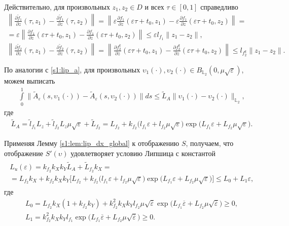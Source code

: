 \documentclass[../main.tex]{subfiles}
\begin{document}
Действительно, для произвольных $z_1, z_2 \in D$ и всех $\tau \in [0, 1]$ справедливо
\begin{gather*}
	 \left\| \frac{\partial \widetilde{f}_1}{\partial z}(\tau, z_1) - \frac{\partial \widetilde{f}_1}{\partial z}(\tau, z_2) \right\| = 
	 \left\| \varepsilon \frac{\partial f_1}{\partial z}(\varepsilon \tau + t_0, z_1) - \varepsilon \frac{\partial f_1}{\partial z}(\varepsilon \tau + t_0, z_2) \right\| = \\ =
	 \varepsilon \left\| \frac{\partial f_1}{\partial z}(\varepsilon \tau + t_0, z_1) - \frac{\partial f_1}{\partial z}(\varepsilon \tau + t_0, z_2) \right\| 
	 \leqslant \varepsilon l_{f_1} \| z_1 - z_2\|, \\
	 \left\| \frac{\partial \widetilde{f}_2}{\partial z}(\tau,z_1) - \frac{\partial \widetilde{f}_2}{\partial z}(\tau,z_2) \right\| = 
	\left\| \frac{\partial f_2^k}{\partial z}(\varepsilon \tau + t_0,z_1) - \frac{\partial f_2^k}{\partial z}(\varepsilon \tau + t_0,z_2) \right\| 
	\leqslant l_{f_2^k} \| z_1 - z_2\|.
\end{gather*}
 
По аналогии с \eqref{s1:lip_a}, для произвольных $ \upsilon_1(\cdot), \upsilon_2(\cdot) \in B_{\mathbb{L}_2}(0,\mu\sqrt{\varepsilon})$, можем выписать
\begin{gather*}
 \int\limits_{0}^{1} \|\widetilde{A}_{\varepsilon}(s, \upsilon_1(\cdot)) - \widetilde{A}_{\varepsilon}(s, \upsilon_2(\cdot)) \| ds \leqslant \widetilde{L}_A \| \upsilon_1(\cdot) - \upsilon_2(\cdot) \|_{\mathbb{L}_2},
\end{gather*}
 где 
\begin{gather*}%
 \widetilde{L}_A = \widetilde{l}_{f_1} L_z + \widetilde{l}_{f_2} L_z \mu \sqrt{\varepsilon} + \widetilde{L}_{f_2} = 
 L_{f_2} + k_{f_2} \Big( l_{f_1} \varepsilon + l_{f_2} \mu \sqrt{\varepsilon} \Big) \exp\big( L_{f_1} \varepsilon + L_{f_2} \mu \sqrt{\varepsilon} \big).
 \end{gather*}
 
 Применяя Лемму \ref{s1:lem:lip_dx_global} к отображению $S$, получаем, что отображение $S'(\upsilon)$ удовлетворяет условию Липшица с константой 
 \begin{gather}\label{s1:lip_eps}
 \begin{gathered}
 	 L_u(\varepsilon) = k_{f_2} k_X k_Y \widetilde{L}_A + \widetilde{L}_{f_2} k_X = \\ = 
 	L_{f_2} k_X + 
 	k_{f_2} k_X k_Y \Big[ L_{f_2} + k_{f_2} \Big( l_{f_1} \varepsilon + l_{f_2} \mu \sqrt{\varepsilon} \Big) \exp\big( L_{f_1} \varepsilon + L_{f_2} \mu \sqrt{\varepsilon} \big) \Big] \leqslant 
 	L_0 + L_1 \varepsilon,
 \end{gathered}
 \end{gather} 
 где 
 \begin{gather*}
 	L_0 = L_{f_2} k_X (1 + k_{f_2} k_Y) + 
 	k_{f_2}^2 k_X k_Y l_{f_2} \mu \sqrt{\overline{\varepsilon}} \exp\big( L_{f_1} \overline{\varepsilon} + L_{f_2} \mu \sqrt{\overline{\varepsilon}} \big) \geqslant 0, \\
 	 L_1 = k_{f_2}^2 k_X k_Y l_{f_1} \exp\big( L_{f_1} \overline{\varepsilon} + L_{f_2} \mu \sqrt{\overline{\varepsilon}} \big) \geqslant 0.
 \end{gather*} 
 
\end{document}
